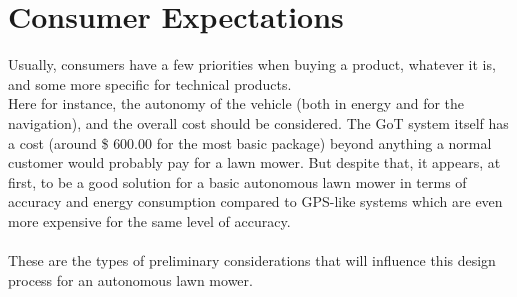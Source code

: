 \section{Consumer Expectations}
Usually, consumers have a few priorities when buying a product, whatever it is, and some more specific for technical products.\\
Here for instance, the autonomy of the vehicle (both in energy and for the navigation), and the overall cost should be considered. The GoT system itself has a cost (around \$ $600.00$ for the most basic package) beyond anything a normal customer would probably pay for a lawn mower. But despite that, it appears, at first, to be a good solution for a basic autonomous lawn mower in terms of accuracy and energy consumption compared to GPS-like systems which are even more expensive for the same level of accuracy. \\\\
These are the types of preliminary considerations that will influence this design process for an autonomous lawn mower.


